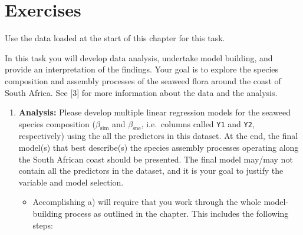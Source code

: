 \documentclass[
  letterpaper,
]{book}
\providecommand{\tightlist}{%
  \setlength{\itemsep}{0pt}\setlength{\parskip}{0pt}}\usepackage{longtable,booktabs,array}
\begin{document}
\section{Exercises}\label{exercises}

\begin{tcolorbox}[enhanced jigsaw, opacitybacktitle=0.6, toptitle=1mm, colframe=quarto-callout-important-color-frame, arc=.35mm, left=2mm, rightrule=.15mm, coltitle=black, opacityback=0, bottomrule=.15mm, bottomtitle=1mm, title=\textcolor{quarto-callout-important-color}{\faExclamation}\hspace{0.5em}{Task G}, toprule=.15mm, colbacktitle=quarto-callout-important-color!10!white, titlerule=0mm, leftrule=.75mm, colback=white, breakable]

Use the data loaded at the start of this chapter for this task.

In this task you will develop data analysis, undertake model building,
and provide an interpretation of the findings. Your goal is to explore
the species composition and assembly processes of the seaweed flora
around the coast of South Africa. See {[}3{]} for more information about
the data and the analysis.

\begin{enumerate}
\def\labelenumi{\alph{enumi}.}
\item
  \textbf{Analysis:} Please develop multiple linear regression models
  for the seaweed species composition (\(\beta_\text{sim}\) and
  \(\beta_\text{sne}\), i.e.~columns called \texttt{Y1} and \texttt{Y2},
  respectively) using the all the predictors in this dataset. At the
  end, the final model(s) that best describe(s) the species assembly
  processes operating along the South African coast should be presented.
  The final model may/may not contain all the predictors in the dataset,
  and it is your goal to justify the variable and model selection.

  \begin{itemize}
  \tightlist
  \item
    Accomplishing a) will require that you work through the whole
    model-building process as outlined in the chapter. This includes the
    following steps:


\end{itemize}
\end{enumerate}
\end{tcolorbox}
\end{document}
